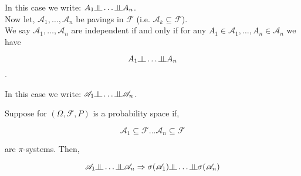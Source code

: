 \documentclass[11pt,fleqn]{book} %
\newcommand{\indep}{\rotatebox[origin=c]{90}{$\models$}}
\begin{document}
In this case we write: $A_1 \indep \dots \indep A_n$.\\


Now let, $\mathscr{A}_1, \dots, \mathscr{A}_n$ be pavings in $\mathscr{F}$ (i.e. $\mathscr{A}_k \subseteq \mathscr{F}$). \\

We say $\mathscr{A}_1, \dots, \mathscr{A}_n$ are independent if and only if for any $A_1 \in \mathscr{A}_1, \dots, A_n \in \mathscr{A}_n$ we have 

$$A_1 \indep \dots \indep A_n $$. 

In this case we write: $\mathscr{A}_1 \indep \dots \indep \mathscr{A}_n$.

\begin{theorem}
	Suppose for $(\Omega, \mathscr{F}, P)$ is a probability space if, 

	$$\mathscr{A}_1 \subseteq \mathscr{F} \dots \mathscr{A}_n \subseteq \mathscr{F}$$

	are $\pi$-systems. Then,

	$$\mathscr{A}_1 \indep \dots \indep \mathscr{A}_n  \Rightarrow \sigma(\mathscr{A}_1) \indep \dots \indep \sigma(\mathscr{A}_n)$$
\end{theorem}
\end{document}
